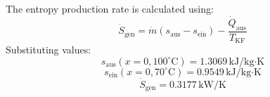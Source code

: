The entropy production rate is calculated using:  
\[
\dot{S}_{\text{gen}} = \dot{m} (s_{\text{aus}} - s_{\text{ein}}) - \frac{\dot{Q}_{\text{aus}}}{T_{\text{KF}}}
\]  
Substituting values:  
\[
s_{\text{aus}} (x = 0, 100^\circ\text{C}) = 1.3069 \, \text{kJ/kg·K}
\]  
\[
s_{\text{ein}} (x = 0, 70^\circ\text{C}) = 0.9549 \, \text{kJ/kg·K}
\]  
\[
\dot{S}_{\text{gen}} = 0.3177 \, \text{kW/K}
\]